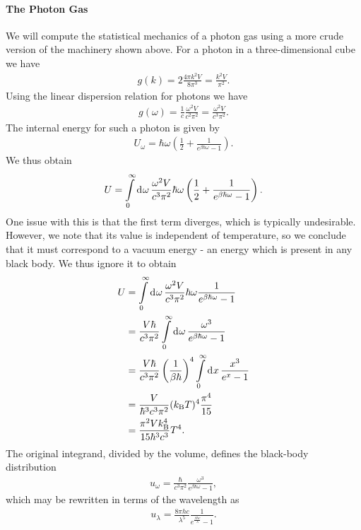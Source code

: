\paragraph{The Photon Gas}
We will compute the statistical mechanics of a photon gas using a more crude version of the machinery shown above. For a photon in a three-dimensional cube we have
\begin{align*}
	g(k) = 2\frac{4\pi k^{2}V}{8\pi^{3}} = \frac{k^{2}V}{\pi^{2}}.
\end{align*}
Using the linear dispersion relation for photons we have
\begin{align*}
	g(\omega) = \frac{1}{c}\frac{\omega^{2}V}{c^{2}\pi^{2}} = \frac{\omega^{2}V}{c^{3}\pi^{2}}.
\end{align*}
The internal energy for such a photon is given by
\begin{align*}
	U_{\omega} = \hbar\omega\left(\frac{1}{2} + \frac{1}{e^{\beta\hbar\omega} - 1}\right).
\end{align*}
We thus obtain
\begin{align*}
	U = \int\limits_{0}^{\infty}\dd[]{\omega}\frac{\omega^{2}V}{c^{3}\pi^{2}}\hbar\omega\left(\frac{1}{2} + \frac{1}{e^{\beta\hbar\omega} - 1}\right).
\end{align*}
One issue with this is that the first term diverges, which is typically undesirable. However, we note that its value is independent of temperature, so we conclude that it must correspond to a vacuum energy - an energy which is present in any black body. We thus ignore it to obtain
\begin{align*}
	U &= \int\limits_{0}^{\infty}\dd[]{\omega}\frac{\omega^{2}V}{c^{3}\pi^{2}}\hbar\omega\frac{1}{e^{\beta\hbar\omega} - 1} \\
	  &= \frac{V\hbar}{c^{3}\pi^{2}} \int\limits_{0}^{\infty}\dd[]{\omega}\frac{\omega^{3}}{e^{\beta\hbar\omega} - 1} \\
	  &= \frac{V\hbar}{c^{3}\pi^{2}}\left(\frac{1}{\beta\hbar}\right)^{4} \int\limits_{0}^{\infty}\dd[]{x}\frac{x^{3}}{e^{x} - 1} \\
	  &= \frac{V}{\hbar^{3}c^{3}\pi^{2}}(k_{\text{B}} T)^{4}\frac{\pi^{4}}{15} \\
	  &= \frac{\pi^{2}Vk_{\text{B}}^{4}}{15\hbar^{3}c^{3}}T^{4}.
\end{align*}
The original integrand, divided by the volume, defines the black-body distribution
\begin{align*}
	u_{\omega} = \frac{\hbar}{c^{3}\pi^{2}}\frac{\omega^{3}}{e^{\beta\hbar\omega} - 1},
\end{align*}
which may be rewritten in terms of the wavelength as
\begin{align*}
	u_{\lambda} = \frac{8\pi hc}{\lambda^{5}}\frac{1}{e^{\frac{\beta hc}{\lambda}} - 1}.
\end{align*}

